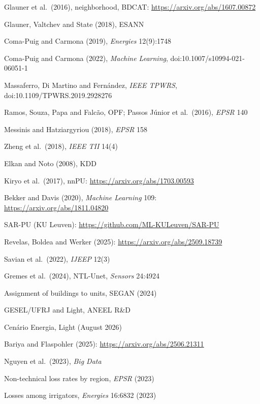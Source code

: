 {\begin{enumerate}[label={[\arabic*]},leftmargin=2.2em,itemsep=1pt]
\item Glauner et al.\ (2016), neighborhood, BDCAT: \url{https://arxiv.org/abs/1607.00872}
\item Glauner, Valtchev and State (2018), ESANN
\item Coma-Puig and Carmona (2019), \emph{Energies} 12(9):1748
\item Coma-Puig and Carmona (2022), \emph{Machine Learning}, doi:10.1007/s10994-021-06051-1
\item Massaferro, Di Martino and Fernández, \emph{IEEE TPWRS}, doi:10.1109/TPWRS.2019.2928276
\item Ramos, Souza, Papa and Falcão, OPF; Passos Júnior et al.\ (2016), \emph{EPSR} 140
\item Messinis and Hatziargyriou (2018), \emph{EPSR} 158
\item Zheng et al.\ (2018), \emph{IEEE TII} 14(4)
\item Elkan and Noto (2008), KDD
\item Kiryo et al.\ (2017), nnPU: \url{https://arxiv.org/abs/1703.00593}
\item Bekker and Davis (2020), \emph{Machine Learning} 109: \url{https://arxiv.org/abs/1811.04820}
\item SAR-PU (KU Leuven): \url{https://github.com/ML-KULeuven/SAR-PU}
\item Revelas, Boldea and Werker (2025): \url{https://arxiv.org/abs/2509.18739}
\item Savian et al.\ (2022), \emph{IJEEP} 12(3)
\item Gremes et al.\ (2024), NTL-Unet, \emph{Sensors} 24:4924
\item Assignment of buildings to units, SEGAN (2024)
\item GESEL/UFRJ and Light, ANEEL R\&D
\item Cenário Energia, Light (August 2026)
\item Bariya and Flaspohler (2025): \url{https://arxiv.org/abs/2506.21311}
\item Nguyen et al.\ (2023), \emph{Big Data}
\item Non-technical loss rates by region, \emph{EPSR} (2023)
\item Losses among irrigators, \emph{Energies} 16:6832 (2023)
\end{enumerate}}
